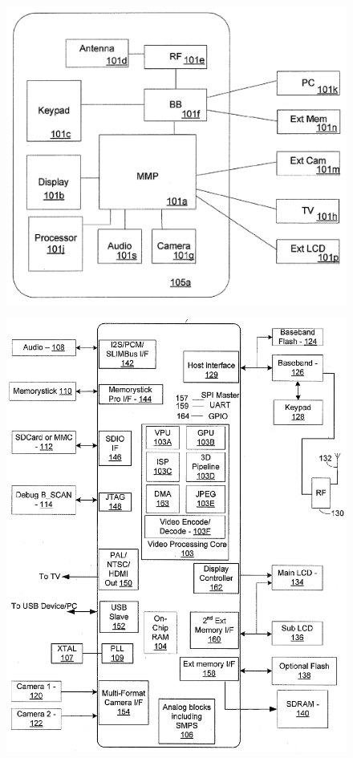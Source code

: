 \documentclass{jsarticle}
\begin{document}
\begin{figure}
\includegraphics[width=\textwidth]{vc-fig1a.png}
\label{pic:vc-fig1a}
\end{figure}

\begin{figure}
\includegraphics[width=\textwidth]{vc-fig1b.png}
\label{pic:vc-fig1b}
\end{figure}
\end{document}
